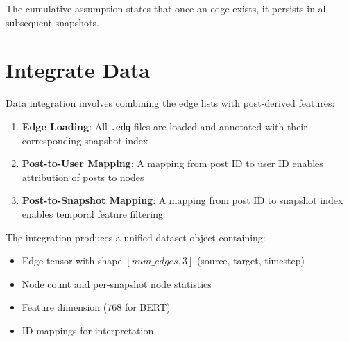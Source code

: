 The cumulative assumption states that once an edge exists, it persists in all subsequent snapshots. 




\section{Integrate Data}

Data integration involves combining the edge lists with post-derived features:

\begin{enumerate}
	\item \textbf{Edge Loading}: All \texttt{.edg} files are loaded and annotated with their corresponding snapshot index
	\item \textbf{Post-to-User Mapping}: A mapping from post ID to user ID enables attribution of posts to nodes
	\item \textbf{Post-to-Snapshot Mapping}: A mapping from post ID to snapshot index enables temporal feature filtering
\end{enumerate}

The integration produces a unified dataset object containing:
\begin{itemize}
	\item Edge tensor with shape $[num\_edges, 3]$ (source, target, timestep)
	\item Node count and per-snapshot node statistics
	\item Feature dimension (768 for BERT)
	\item ID mappings for interpretation
\end{itemize}

